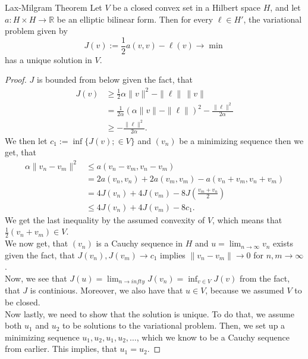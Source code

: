 \begin{thmx}{Lax-Milgram Theorem}
Let $V$ be a closed convex set in a Hilbert space $H$, and let $a:H \times H \rightarrow \mathbb{R}$ be an elliptic bilinear form. Then for every $\ell\in H'$, the variational problem given by
\[
    J(v):=\frac{1}{2} a(v,v) - \ell(v) \longrightarrow \min    
\]
has a unique solution in $V$.
\end{thmx}

\begin{proof}
    $J$ is bounded from below given the fact, that
    \begin{align*}
        J(v) &\geq \frac{1}{2} \alpha \|v\|^2 - \|\ell\| \, \|v\|\\
        &= \frac{1}{2\alpha} {(\alpha \|v\|-\|\ell\|)}^2 - \frac{\|\ell\|^2}{2\alpha} \\
        &\geq - \frac{\|\ell\|^2}{2\alpha}.
    \end{align*}
    We then let $c_1 := \inf\{J(v); \in V\}$ and $(v_n)$ be a minimizing sequence then we get, that 
    \begin{align*}
        \alpha \|v_n-v_m\|^2 &\leq a(v_n-v_m,v_n-v_m) \\
        &= 2a(v_n,v_n) + 2a(v_m,v_m) - a (v_n+v_m,v_n+v_m) \\
        &= 4J(v_n) + 4J(v_m) - 8J(\frac{v_m+v_n}{2}) \\
        &\leq 4J(v_n) + 4J(v_m) - 8c_1. 
    \end{align*}
    We get the last inequality by the assumed convexity of $V$, which means that $\frac{1}{2}(v_n + v_m) \in V$. 
    \\
    We now get, that $(v_n)$ is a Cauchy sequence in $H$ and $u = \lim_{n\rightarrow \infty}v_n$ exists given the fact, that $J(v_n),J(v_m)\rightarrow c_1$ implies $\|v_n - v_m\| \rightarrow 0$ for $n,m\rightarrow \infty$.  
    \\
    Now, we see that $J(u) = \lim_{n\rightarrow infty} J(v_n) = \inf_{v\in V} J(v)$ from the fact, that $J$ is continious. Moreover, we also have that $u\in V$, because we assumed $V$ to be closed. 
    \\
    Now lastly, we need to show that the solution is unique. To do that, we assume both $u_1$ and $u_2$ to be solutions to the variational problem. 
    Then, we set up a minimizing sequence $u_1,u_2,u_1,u_2,\ldots$, which we know to be a Cauchy sequence from earlier. This implies, that $u_1 = u_2$.
\end{proof}
